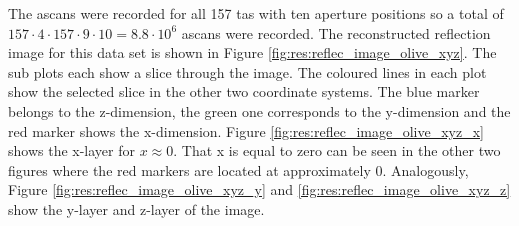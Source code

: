 The \acp{ascan} were recorded for all 157 \ac{tas} with ten aperture positions so a total of $157\cdot4\cdot157\cdot9\cdot10 = 8.8\cdot10^6$ \acp{ascan} were recorded. The reconstructed reflection image for this data set is shown in Figure \ref{fig:res:reflec_image_olive_xyz}. The sub plots each show a slice through the image. The coloured lines in each plot show the selected slice in the other two coordinate systems. The blue marker belongs to the z-dimension, the green one corresponds to the y-dimension and the red marker shows the x-dimension. Figure \ref{fig:res:reflec_image_olive_xyz_x} shows the x-layer for $x \approx  0$. That x is equal to zero can be seen in the other two figures where the red markers are located at approximately 0. Analogously, Figure \ref{fig:res:reflec_image_olive_xyz_y} and  \ref{fig:res:reflec_image_olive_xyz_z} show the y-layer and z-layer of the image.

